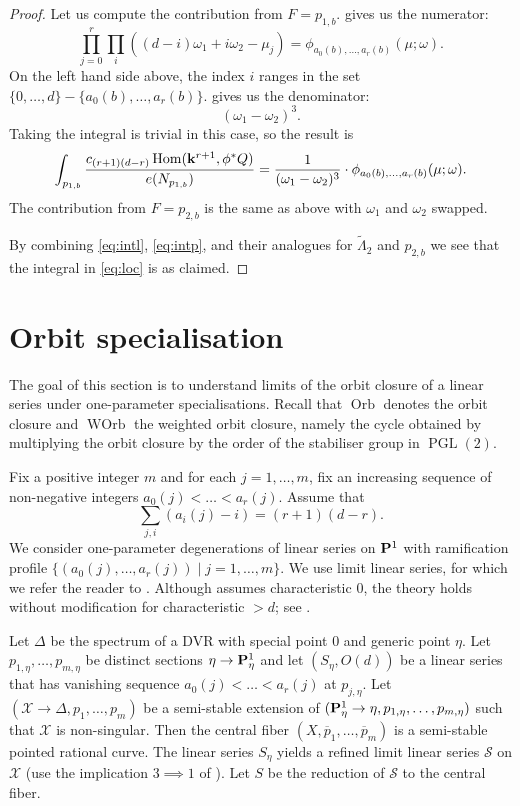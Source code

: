 \documentclass[11pt]{amsart}
\renewcommand {\P}{{\bf P}}
\providecommand{\PGL}{\operatorname{PGL}}
\providecommand{\Hom}{\operatorname{Hom}}
\DeclareMathOperator{\Orb}{Orb}
\DeclareMathOperator{\WOrb}{WOrb}
\begin{document}
\begin{proof}
Let us compute the contribution from \(F = p_{1,b}\).
 gives us the numerator:
\[ \prod_{j = 0}^{r} \prod_{i}((d-i)\omega_1 + i\omega_2 - \mu_j) = \phi_{a_0(b), \dots, a_r(b)}(\mu;\omega).\]
On the left hand side above, the index \(i\) ranges in the set \(\{0,\dots, d\} - \{a_0(b), \dots, a_r(b)\}\).
 gives us the denominator:
\[ (\omega_1-\omega_2)^3.\]
Taking the integral is trivial in this case, so the result is
\begin{equation}\label{eq:intp}
\int_{p_{1,b}} \frac{c_{(r+1)(d-r)}\Hom(\k^{r+1},\phi^*Q)}{e(N_{p_{1,b}})} =  \frac{1}{(\omega_1-\omega_2)^3} \cdot \phi_{a_0(b), \dots, a_r(b)}(\mu;\omega).
\end{equation}
The contribution from \(F = p_{2,b}\) is the same as above with \(\omega_1\) and \(\omega_2\) swapped.

By combining \eqref{eq:intl}, \eqref{eq:intp}, and their analogues for \(\widetilde \Lambda_2\) and \(p_{2,b}\) we see that the integral in \eqref{eq:loc} is as claimed.
\end{proof}

\section{Orbit specialisation}\label{sec:spec}
The goal of this section is to understand limits of the orbit closure of a linear series under one-parameter specialisations.
Recall that \(\Orb\) denotes the orbit closure and \(\WOrb\) the weighted orbit closure, namely the cycle obtained by multiplying the orbit closure by the order of the stabiliser group in \(\PGL(2)\).

Fix a positive integer \(m\) and for each \(j = 1, \dots, m\), fix an increasing sequence of non-negative integers \(a_0(j)< \dots < a_r(j)\).
Assume that 
\begin{equation}\label{eqn:w}
  \sum_{j,i}(a_i(j) - i) = (r+1)(d-r).
\end{equation}
We consider one-parameter degenerations of linear series on \(\P^1\) with ramification profile \(\{(a_0(j), \dots, a_r(j)) \mid j = 1, \dots, m\}\).
We use limit linear series, for which we refer the reader to \cite{eis.har:86}.
Although \cite{eis.har:86} assumes characteristic 0, the theory holds without modification for characteristic \(> d\); see \cite{oss:06}.

Let \(\Delta\) be the spectrum of a DVR with special point \(0\) and generic point \(\eta\).
Let \(p_{1,\eta}, \dots, p_{m,\eta}\) be distinct sections \(\eta \to \P^1_\eta\) and let \((S_\eta, O(d))\) be a linear series that has vanishing sequence \(a_0(j)< \dots < a_r(j)\) at \(p_{j,\eta}\).
Let \((\mathcal X \to \Delta, p_1, \dots, p_m)\) be a semi-stable extension of \((\P^1_\eta \to \eta, p_{1,\eta}, \dots, p_{m,\eta})\) such that \(\mathcal X\) is non-singular.
Then the central fiber \((X, \overline p_{1}, \dots, \overline p_m)\) is a semi-stable pointed rational curve.
The linear series \(S_\eta\) yields a refined limit linear series \(\mathcal S\) on \(\mathcal X\) (use the implication \(3 \implies 1\) of \cite[Proposition~2.5]{eis.har:86}).
Let \(S\) be the reduction of \(\mathcal S\) to the central fiber.
\end{document}

